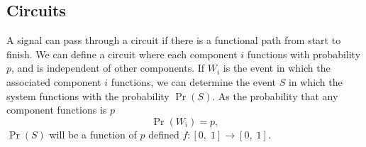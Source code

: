 \documentclass{article}
\begin{document}
\subsection{Circuits}
A signal can pass through a circuit if there is a functional path from
start to finish. We can define a circuit where each component \(i\)
functions with probability \(p\), and is independent of other
components. If \(W_i\) is the event in which the associated component
\(i\) functions, we can determine the event \(S\) in which the system
functions with the probability \(\Pr{\left( S \right)}\). As the
probability that any component functions is \(p\)
\begin{equation*}
    \Pr{\left( W_i \right)} = p,
\end{equation*}
\(\Pr{\left( S \right)}\) will be a function of \(p\) defined \(f:\left[ 0,\; 1 \right] \to \left[ 0,\; 1 \right]\).
\end{document}
